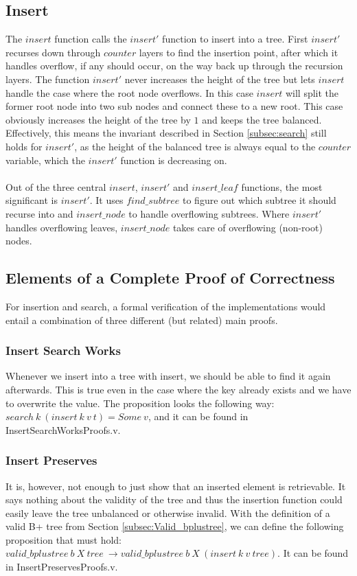 \subsection{Insert}
The $insert$ function calls the $insert'$ function to insert into a tree. First $insert'$ recurses down through $counter$ layers to find the insertion point, after which it handles overflow, if any should occur, on the way back up through the recursion layers. The function $insert'$ never increases the height of the tree but lets $insert$ handle the case where the root node overflows. In this case $insert$ will split the former root node into two sub nodes and connect these to a new root. This case obviously increases the height of the tree by $1$ and keeps the tree balanced. Effectively, this means the invariant described in Section \ref{subsec:search} still holds for $insert'$, as the height of the balanced tree is always equal to the $counter$ variable, which the $insert'$ function is decreasing on.

\paragraph{}
Out of the three central $insert$, $insert'$ and $insert\_leaf$ functions, the most significant is $insert'$. It uses $find\_subtree$ to figure out which subtree it should recurse into and $insert\_node$ to handle overflowing subtrees. Where $insert'$ handles overflowing leaves, $insert\_node$ takes care of overflowing (non-root) nodes.

\subsection{Elements of a Complete Proof of Correctness}
For insertion and search, a formal verification of the implementations would entail a combination of three different (but related) main proofs.

\subsubsection{Insert Search Works}
Whenever we insert into a tree with insert, we should be able to find it again afterwards. This is true even in the case where the key already exists and we have to overwrite the value. The proposition looks the following way: $search\ k\ (insert\ k\ v\ t) = Some\ v$, and it can be found in InsertSearchWorksProofs.v.

\subsubsection{Insert Preserves}
It is, however, not enough to just show that an inserted element is retrievable. It says nothing about the validity of the tree and thus the insertion function could easily leave the tree unbalanced or otherwise invalid. With the definition of a valid B+ tree from Section \ref{subsec:Valid_bplustree}, we can define the following proposition that must hold: $valid\_bplustree\ b\ X\ tree\ \rightarrow valid\_bplustree\ b\ X\ (insert\ k\ v\ tree)$. It can be found in InsertPreservesProofs.v.

